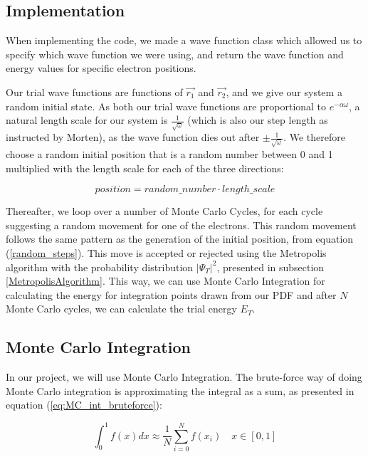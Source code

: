 \documentclass[norsk,a4paper,12pt]{article}
\begin{document}
\subsection{Implementation}
When implementing the code, we made a wave function class which allowed us to specify which wave function we were using, and return the wave function and energy values for specific electron positions.
\par 
\vspace{2mm}

Our trial wave functions are functions of $\vec{r_1}$ and $\vec{r_2}$, and we give our system a random initial state. As both our trial wave functions are proportional to $e^{-\alpha \omega}$, a natural length scale for our system is $\frac{1}{\sqrt{\omega}}$ (which is also our step length as instructed by Morten), as the wave function dies out after $\pm \frac{1}{\sqrt{\omega}}$. We therefore choose a random initial position that is a random number between 0 and 1 multiplied with the length scale for each of the three directions:

\begin{equation}
    position =  random\_number \cdot length\_scale
    \label{random_steps}
\end{equation}

Thereafter, we loop over a number of Monte Carlo Cycles, for each cycle suggesting a random movement for one of the electrons. This random movement follows the same pattern as the generation of the initial position, from equation (\ref{random_steps}). This move is accepted or rejected using the Metropolis algorithm with the probability distribution $|\Psi_T|^2$, presented in subsection \ref{MetropolisAlgorithm}. This way, we can use Monte Carlo Integration for calculating the energy for integration points drawn from our PDF and after $N$ Monte Carlo cycles, we can calculate the trial energy $E_T$.

\subsection{Monte Carlo Integration}
In our project, we will use Monte Carlo Integration. The brute-force way of doing Monte Carlo integration is approximating the integral as a sum, as presented in equation (\ref{eq:MC_int_bruteforce}):

\begin{equation}
    \int_0^1 f(x) dx \approx  \frac{1}{N}\sum_{i=0}^N f(x_i) \quad x \in [0,1]
    \label{eq:MC_int_bruteforce}
\end{equation}
\end{document}
